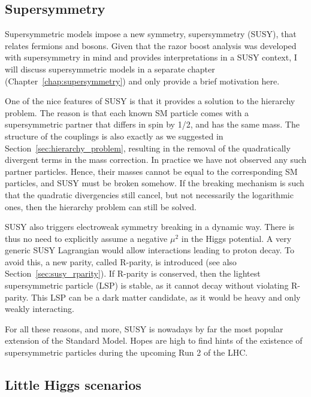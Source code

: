 \subsection{Supersymmetry \label{sec:supersymmetry}}

Supersymmetric models impose a new symmetry, supersymmetry (SUSY), that relates fermions and
bosons. Given that the razor boost analysis was developed with supersymmetry in mind and provides
interpretations in a SUSY context, I will discuss supersymmetric models in a separate chapter
(Chapter~\ref{chap:supersymmetry}) and only provide a brief motivation here. 

One of the nice features of SUSY is that it provides a solution to the hierarchy problem. 
The reason is that each known SM particle comes with a supersymmetric partner that differs in
spin by 1/2, and has the same mass. The structure of the couplings is also exactly as we suggested
in Section~\ref{sec:hierarchy_problem}, resulting in the removal of the quadratically divergent
terms in the mass correction. In practice we have not observed any such partner particles. Hence,
their masses cannot be equal to the corresponding SM particles, and SUSY must be broken somehow. 
If the breaking mechanism is such that the quadratic divergencies still cancel, but not necessarily
the logarithmic ones, then the hierarchy problem can still be solved. 

SUSY also triggers electroweak symmetry breaking in a dynamic way. There is thus no need to
explicitly assume a negative $\mu^2$ in the Higgs potential. 
A very generic SUSY Lagrangian would allow interactions leading to proton decay. To avoid this, a
new parity, called R-parity, is introduced (see also Section~\ref{sec:susy_rparity}). If R-parity is
conserved, then the lightest supersymmetric particle (LSP) is
stable, as it cannot decay without violating R-parity. This LSP can be a dark matter candidate, as
it would be heavy and only weakly interacting. 

For all these reasons, and more, SUSY is nowadays by far the most popular extension of the Standard
Model. Hopes are high to find hints of the existence of supersymmetric particles during the
upcoming Run 2 of the LHC. 

\subsection{Little Higgs scenarios \label{sec:little_higgs}}

